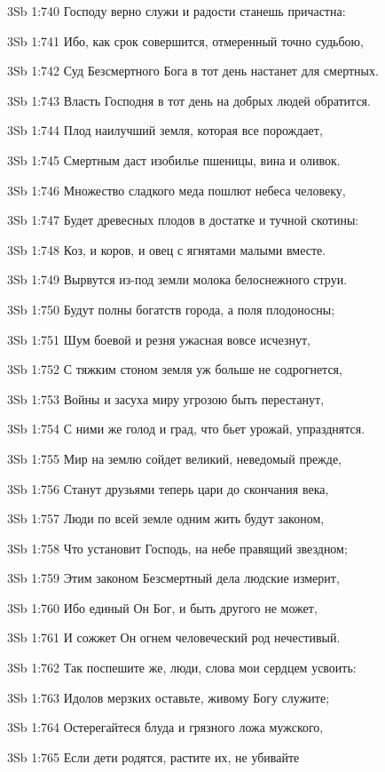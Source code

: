 \vs 3Sb 1:740 Господу верно служи и радости станешь причастна: 

\vs 3Sb 1:741 Ибо, как срок совершится, отмеренный точно судьбою,

\vs 3Sb 1:742 Суд Безсмертного Бога в тот день настанет для смертных.

\vs 3Sb 1:743 Власть Господня в тот день на добрых людей обратится. 

\vs 3Sb 1:744 Плод наилучший земля, которая все порождает, 

\vs 3Sb 1:745 Смертным даст  изобилье пшеницы, вина и оливок. 

\vs 3Sb 1:746 Множество сладкого меда пошлют небеса человеку, 

\vs 3Sb 1:747 Будет древесных плодов в достатке и тучной скотины: 

\vs 3Sb 1:748 Коз, и коров, и овец с ягнятами малыми вместе. 

\vs 3Sb 1:749 Вырвутся из-под земли молока белоснежного струи.

\vs 3Sb 1:750 Будут полны богатств города, а поля плодоносны;

\vs 3Sb 1:751 Шум боевой и резня ужасная вовсе исчезнут,

\vs 3Sb 1:752 С тяжким стоном земля уж больше не содрогнется,

\vs 3Sb 1:753 Войны и засуха миру угрозою быть перестанут,

\vs 3Sb 1:754 С ними же голод и град, что бьет урожай, упразднятся.

\vs 3Sb 1:755 Мир на землю сойдет великий, неведомый прежде, 

\vs 3Sb 1:756 Станут друзьями теперь цари до скончания века, 

\vs 3Sb 1:757 Люди по всей земле одним жить будут законом, 

\vs 3Sb 1:758 Что установит Господь, на небе правящий звездном; 

\vs 3Sb 1:759 Этим законом Безсмертный дела людские измерит,

\vs 3Sb 1:760 Ибо единый Он Бог, и быть другого не может, 

\vs 3Sb 1:761 И сожжет Он огнем человеческий род нечестивый.

\vs 3Sb 1:762 Так поспешите же, люди, слова мои сердцем усвоить: 

\vs 3Sb 1:763 Идолов мерзких оставьте, живому Богу служите; 

\vs 3Sb 1:764 Остерегайтеся блуда и грязного ложа мужского, 

\vs 3Sb 1:765 Если дети родятся, растите их, не убивайте  

